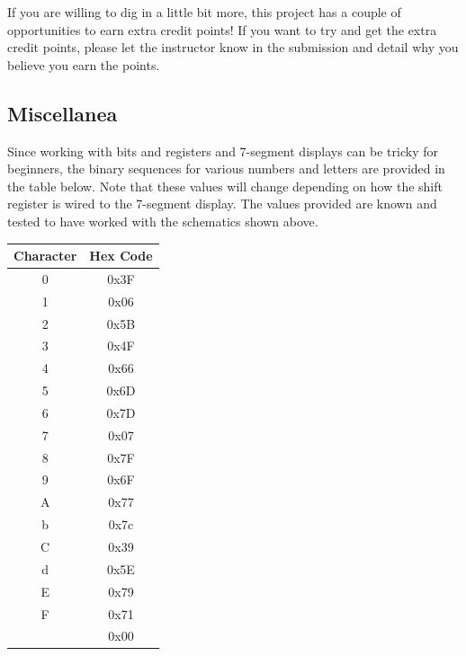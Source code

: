     If you are willing to dig in a little bit more, this project has a couple of opportunities to earn extra credit points!
    If you want to try and get the extra credit points, please let the instructor know in the submission and detail why you believe you earn the points.

    \subsection*{Miscellanea}
    Since working with bits and registers and 7-segment displays can be tricky for beginners, the binary sequences for various numbers and letters are provided in the table below. Note that these values will change depending on how the shift register is wired to the 7-segment display. The values provided are known and tested to have worked with the schematics shown above.

    \begin{margintable}[-1.5in]
        \begin{tabular}{c | c}
            \toprule
            Character & Hex Code \\

            \midrule
            0 & 0x3F \\
            1 & 0x06 \\
            2 & 0x5B \\
            3 & 0x4F \\
            4 & 0x66 \\
            5 & 0x6D \\
            6 & 0x7D \\
            7 & 0x07 \\
            8 & 0x7F \\
            9 & 0x6F \\
            A & 0x77 \\
            b & 0x7c \\
            C & 0x39 \\
            d & 0x5E \\
            E & 0x79 \\
            F & 0x71 \\
                & 0x00 \\

            \bottomrule
        \end{tabular}
    \end{margintable}


